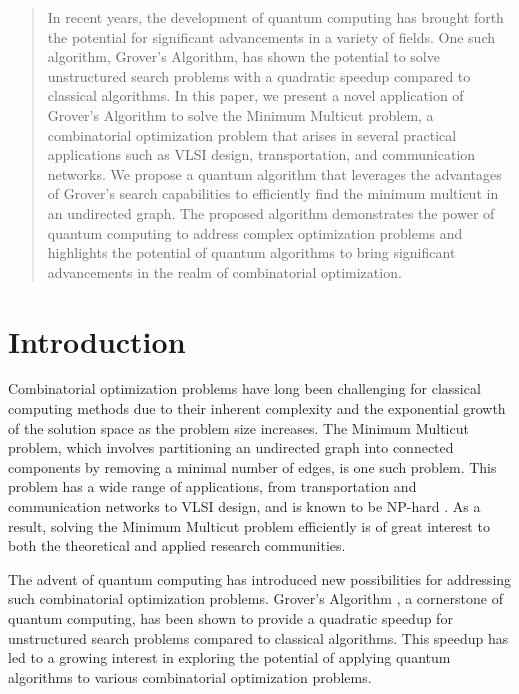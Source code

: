 \begin{abstract}
In recent years, the development of quantum computing has brought forth the potential for significant advancements in a variety of fields. One such algorithm, Grover's Algorithm, has shown the potential to solve unstructured search problems with a quadratic speedup compared to classical algorithms. In this paper, we present a novel application of Grover's Algorithm to solve the Minimum Multicut problem, a combinatorial optimization problem that arises in several practical applications such as VLSI design, transportation, and communication networks. We propose a quantum algorithm that leverages the advantages of Grover's search capabilities to efficiently find the minimum multicut in an undirected graph. The proposed algorithm demonstrates the power of quantum computing to address complex optimization problems and highlights the potential of quantum algorithms to bring significant advancements in the realm of combinatorial optimization.

\end{abstract}

\section{Introduction}\label{sec:intro}

Combinatorial optimization problems have long been challenging for classical computing methods due to their inherent complexity and the exponential growth of the solution space as the problem size increases. The Minimum Multicut problem, which involves partitioning an undirected graph into connected components by removing a minimal number of edges, is one such problem. This problem has a wide range of applications, from transportation and communication networks to VLSI design, and is known to be NP-hard \cite{garey1979computers}. As a result, solving the Minimum Multicut problem efficiently is of great interest to both the theoretical and applied research communities.

The advent of quantum computing has introduced new possibilities for addressing such combinatorial optimization problems. Grover's Algorithm \cite{grover1996fast}, a cornerstone of quantum computing, has been shown to provide a quadratic speedup for unstructured search problems compared to classical algorithms. This speedup has led to a growing interest in exploring the potential of applying quantum algorithms to various combinatorial optimization problems.

